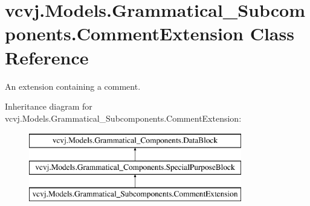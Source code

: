 \hypertarget{classvcvj_1_1_models_1_1_grammatical___subcomponents_1_1_comment_extension}{}\section{vcvj.\+Models.\+Grammatical\+\_\+\+Subcomponents.\+Comment\+Extension Class Reference}
\label{classvcvj_1_1_models_1_1_grammatical___subcomponents_1_1_comment_extension}


An extension containing a comment.  


Inheritance diagram for vcvj.\+Models.\+Grammatical\+\_\+\+Subcomponents.\+Comment\+Extension\+:\begin{figure}[H]
\begin{center}
\leavevmode
\includegraphics[height=3.000000cm]{classvcvj_1_1_models_1_1_grammatical___subcomponents_1_1_comment_extension}
\end{center}
\end{figure}
